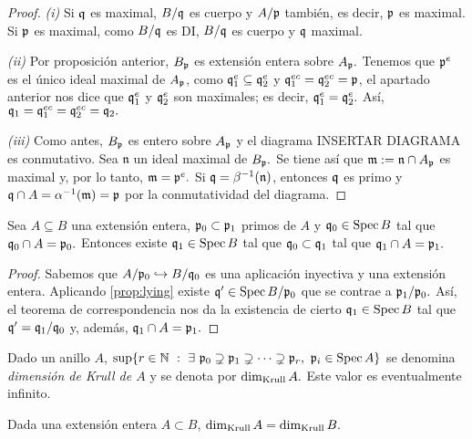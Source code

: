 \documentclass[../main.tex]{subfiles}
\begin{document}
	\begin{proof}
		\textit{(i)} Si $\mathfrak{q}$ es maximal, $B/\mathfrak{q}$ es cuerpo y $A/\mathfrak{p}$ también, es decir, $\mathfrak{p}$ es maximal. Si $\mathfrak{p}$ es maximal, como $B/\mathfrak{q}$ es DI, $B/\mathfrak{q}$ es cuerpo y $\mathfrak{q}$ maximal.
		
		\textit{(ii)} Por proposición anterior, $B_{\mathfrak{p}}$ es extensión entera sobre $A_{\mathfrak{p}}.$ Tenemos que $\mathfrak{p}^e$ es el único ideal maximal de $A_{\mathfrak{p}}$, como $\mathfrak{q}_1^e\subseteq \mathfrak{q}_2^e$ y $\mathfrak{q}_1^{ec}= \mathfrak{q}_2^{ec}=\mathfrak{p}$, el apartado anterior nos dice que $\mathfrak{q}_1^e$ y $\mathfrak{q}_2^e$ son maximales; es decir, $\mathfrak{q}_1^e=\mathfrak{q}_2^e.$ Así, $\mathfrak{q}_1=\mathfrak{q}_1^{ec}=\mathfrak{q}_2^{ec}=\mathfrak{q}_2.$
		
		\textit{(iii)} Como antes, $B_{\mathfrak{p}}$ es entero sobre $A_{\mathfrak{p}}$ y el diagrama INSERTAR DIAGRAMA es conmutativo. Sea $\mathfrak{n}$ un ideal maximal de $B_{\mathfrak{p}}.$ Se tiene así que $\mathfrak{m}:=\mathfrak{n}\cap A_{\mathfrak{p}}$ es maximal y, por lo tanto, $\mathfrak{m}=\mathfrak{p}^e.$ Si $\mathfrak{q}=\beta^{-1}(\mathfrak{n})$, entonces $\mathfrak{q}$ es primo y $\mathfrak{q}\cap A=\alpha^{-1}(\mathfrak{m})=\mathfrak{p}$ por la conmutatividad del diagrama.
	\end{proof}
	
	\begin{theorem}[Going-up]
		Sea $A\subseteq B$ una extensión entera, $\mathfrak{p}_0\subset\mathfrak{p}_1$ primos de $A$ y $\mathfrak{q}_0\in\operatorname{Spec} B$ tal que $\mathfrak{q}_0\cap  A=\mathfrak{p}_0.$ Entonces existe $\mathfrak{q}_1\in\operatorname{Spec} B$ tal que $\mathfrak{q}_0\subset\mathfrak{q}_1$ tal que $\mathfrak{q}_1\cap A=\mathfrak{p}_1.$
	\end{theorem}
	
	\begin{proof}
		Sabemos que $A/\mathfrak{p}_0\hookrightarrow B/\mathfrak{q}_0$ es una aplicación inyectiva y una extensión entera. Aplicando \ref{prop:lying} existe $\mathfrak{q}'\in\operatorname{Spec} {B/\mathfrak{p}_0}$ que se contrae a $\mathfrak{p}_1/\mathfrak{p}_0.$ Así, el teorema de correspondencia nos da la existencia de cierto $\mathfrak{q}_1\in\operatorname{Spec} B$ tal que $\mathfrak{q}'=\mathfrak{q}_1/\mathfrak{q}_0$ y, además, $\mathfrak{q}_1\cap A=\mathfrak{p}_1.$
	\end{proof}
	
	\begin{definition}
		Dado un anillo $A$, $\sup\{r\in\N\ :\ \exists\ \p_0\supsetneq\p_1\supsetneq\cdots\supsetneq\p_r,\ \p_i\in\Spec A\}$ se denomina \textit{dimensión de Krull de $A$} y se denota por $\dim_{\text{Krull}} A.$ Este valor es eventualmente infinito.
	\end{definition}
	
	\begin{corollary}
		Dada una extensión entera $A\subset B$, $\dim_{\text{Krull}} A=\dim_{\text{Krull}} B.$
	\end{corollary}
	
\end{document}
